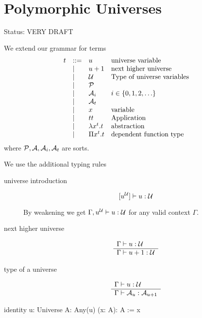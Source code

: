 \section{Polymorphic Universes}

\noindent Status: VERY DRAFT


We extend our grammar for terms
$$
\begin{array}{llll}
    t
    &::= &u
    &\text{universe variable}

    \\

    &\mid & u+1
    &\text{next higher universe}

    \\

    &\mid & \Universe
    &\text{Type of universe variables}

    \\

    &\mid & \Prop

    \\

    &\mid & \Any_i
    & i \in \set{0, 1, 2, \ldots}

    \\

    &\mid & \Any_t

    \\

    &\mid & x
    &\text{variable}

    \\

    &\mid & t t
    &\text{Application}

    \\

    &\mid & \lambda x^t. t
    &\text{abstraction}

    \\

    &\mid & \Pi x^t. t
    &\text{dependent function type}
\end{array}
$$
where $\Prop, \Any, \Any_i, \Any_t$ are sorts.



We use the additional typing rules
\begin{description}

\item[universe introduction]
    $$
    [u^{\cal{U}}] \vdash u : {\cal{U}}
    $$

    By weakening we get $\Gamma, u^{\cal{U}} \vdash u : {\cal{U}}$ for any valid
    context $\Gamma$.

\item [next higher universe]
    $$
    \begin{array}{l} \Gamma \vdash u : {\cal{U}} \\ \hline \Gamma \vdash u+1 : {\cal{U}}\end{array}
    $$

\item [type of a universe]
    $$
    \begin{array}{l} \Gamma \vdash u : {\cal{U}} \\ \hline \Gamma \vdash {\cal{A}}_u : {\cal{A}}_{u+1}\end{array}
    $$
\end{description}




\begin{alba}
    identity
        {u: Universe} {A: Any(u)}
        (x: A): A
    :=
        x
\end{alba}
